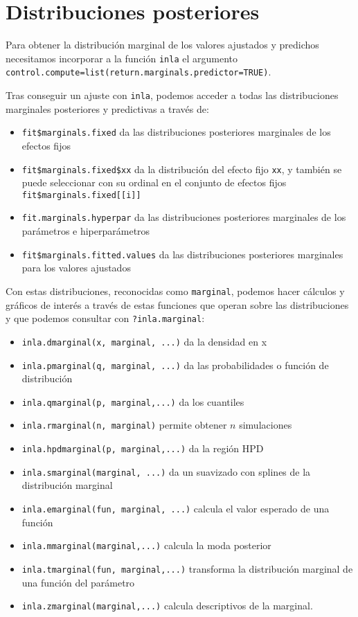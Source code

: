 \documentclass[
]{book}
\providecommand{\tightlist}{%
  \setlength{\itemsep}{0pt}\setlength{\parskip}{0pt}}
\begin{document}
\hypertarget{distribuciones-posteriores}{%
\section{Distribuciones posteriores}\label{distribuciones-posteriores}}

Para obtener la distribución marginal de los valores ajustados y predichos necesitamos incorporar a la función \texttt{inla} el argumento \texttt{control.compute=list(return.marginals.predictor=TRUE)}.

Tras conseguir un ajuste con \texttt{inla}, podemos acceder a todas las distribuciones marginales posteriores y predictivas a través de:

\begin{itemize}
\tightlist
\item
  \texttt{fit\$marginals.fixed} da las distribuciones posteriores marginales de los efectos fijos
\item
  \texttt{fit\$marginals.fixed\$xx} da la distribución del efecto fijo \texttt{xx}, y también se puede seleccionar con su ordinal en el conjunto de efectos fijos \texttt{fit\$marginals.fixed{[}{[}i{]}{]}}
\item
  \texttt{fit.marginals.hyperpar} da las distribuciones posteriores marginales de los parámetros e hiperparámetros
\item
  \texttt{fit\$marginals.fitted.values} da las distribuciones posteriores marginales para los valores ajustados
\end{itemize}

Con estas distribuciones, reconocidas como \texttt{marginal}, podemos hacer cálculos y gráficos de interés a través de estas funciones que operan sobre las distribuciones y que podemos consultar con \texttt{?inla.marginal}:

\begin{itemize}
\tightlist
\item
  \texttt{inla.dmarginal(x,\ marginal,\ ...)} da la densidad en x
\item
  \texttt{inla.pmarginal(q,\ marginal,\ ...)} da las probabilidades o función de distribución
\item
  \texttt{inla.qmarginal(p,\ marginal,...)} da los cuantiles
\item
  \texttt{inla.rmarginal(n,\ marginal)} permite obtener \(n\) simulaciones
\item
  \texttt{inla.hpdmarginal(p,\ marginal,...)} da la región HPD
\item
  \texttt{inla.smarginal(marginal,\ ...)} da un suavizado con splines de la distribución marginal
\item
  \texttt{inla.emarginal(fun,\ marginal,\ ...)} calcula el valor esperado de una función
\item
  \texttt{inla.mmarginal(marginal,...)} calcula la moda posterior
\item
  \texttt{inla.tmarginal(fun,\ marginal,...)} transforma la distribución marginal de una función del parámetro
\item
  \texttt{inla.zmarginal(marginal,...)} calcula descriptivos de la marginal.
\end{itemize}
\end{document}
